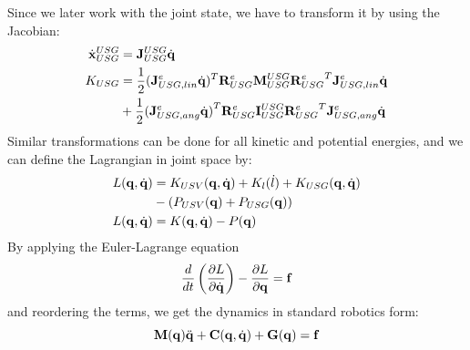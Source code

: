 \documentclass[a4paper,11pt]{article}
\newcommand{\Mat}[1]{\mathbf{\MakeUppercase{#1}}}
\renewcommand{\vec}[1]{\boldsymbol{\mathbf{\MakeLowercase{#1}}}}
\begin{document}
Since we later work with the joint state, we have to transform it by using the Jacobian:
\begin{align}
	\dot{\vec{x}}_{USG}^{USG} &= \Mat{J}_{USG}^{USG} \dot{\vec{q}}
	\\
	K_{USG} &= \frac 1 2  (\Mat{J}_{USG, lin}^{e} \dot{\vec{q}})^T {\Mat{R}_{USG}^{e}} \Mat{M}_{USG}^{USG} {\Mat{R}_{USG}^{e}}^T \Mat{J}_{USG, lin}^{e} \dot{\vec{q}} \notag\\
	&+ \frac 1 2 {(\Mat{J}_{USG, ang}^{e} \dot{\vec{q}})}^T \Mat{R}_{USG}^{e} \Mat{I}_{USG}^{USG} {\Mat{R}_{USG}^{e}}^T \Mat{J}_{USG, ang}^{e} \dot{\vec{q}}
\end{align}
Similar transformations can be done for all kinetic and potential energies, and we can define the Lagrangian in joint space by:
\begin{align}
	L(\vec q, \dot{\vec{q}}) &= K_{USV}(\vec q, \dot{\vec{q}}) + K_{l}(\dot l) + K_{USG}(\vec q, \dot{\vec{q}}) \notag\\
	& - (P_{USV}(\vec{q}) + P_{USG}(\vec{q}))
	\\
	L(\vec q, \dot{\vec{q}}) &= K(\vec q, \dot{\vec{q}}) - P(\vec{q})
\end{align}
By applying the Euler-Lagrange equation 
\begin{equation}
	\frac{d}{dt} \left( \frac{\partial L}{\partial \dot{\vec{q}}} \right) - \frac{\partial L}{\partial \vec{q}} = \vec{f}
\end{equation}
and reordering the terms, we get the dynamics in standard robotics form:
\begin{equation}
	\Mat{M}(\vec{q}) \ddot{\vec{q}} + \Mat{C}(\vec{q}, \dot{\vec{q}}) + \Mat{G}(\vec{q}) = \vec{f}
\end{equation}
\end{document}

